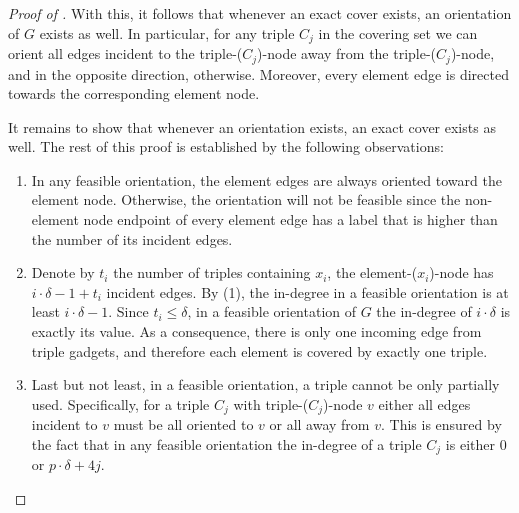 \documentclass[a4paper]{article}
\begin{document}
\begin{proof}[Proof of ]
With this, it follows that whenever an exact cover exists, an orientation of $G$ exists as well. In particular, for any triple $C_j$ in the covering set we can orient all edges incident to the triple-($C_j$)-node away from the triple-($C_j$)-node, and in the opposite direction, otherwise. Moreover, every element edge is directed towards the corresponding element node.

It remains to show that whenever an orientation exists, an exact cover exists as well.
The rest of this proof is established by the following observations:
\begin{enumerate}
    \item In any feasible orientation, the element edges are always oriented toward the element node. Otherwise, the orientation will not be feasible since the non-element node endpoint of every element edge has a label that is higher than the number of its incident edges.
    \item Denote by $t_i$ the number of triples containing $x_i$, the element-($x_i$)-node has $i\cdot\delta-1+t_i$ incident edges. By (1), the in-degree in a feasible orientation is at least $i\cdot\delta-1$. Since $t_i\leq \delta$, in a feasible orientation of $G$ the in-degree of $i\cdot\delta$ is exactly its value. As a consequence, there is only one incoming edge from triple gadgets, and therefore each element is covered by exactly one triple.
    \item Last but not least, in a feasible orientation, a triple cannot be only partially used. Specifically, for a triple $C_j$ with triple-($C_j$)-node $v$ either all edges incident to $v$ must be all oriented to $v$ or all away from $v$. This is ensured by the fact that in any feasible orientation the in-degree of a triple $C_j$ is either $0$ or $p\cdot\delta +4j$. \qedhere
\end{enumerate}
\end{proof}

\end{document}

